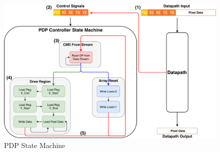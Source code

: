 \begin{figure}
    \centering
    \includegraphics[width=1.0\textwidth]{fig/pdp_state_machine.pdf}
    \caption{PDP State Machine}
    \label{fig:state_machine}
\end{figure}
